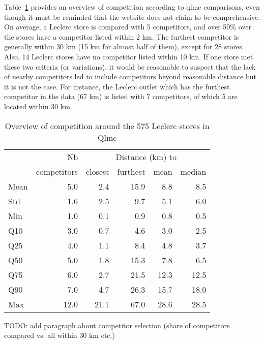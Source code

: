 \documentclass[english]{article}
\begin{document}
Table~\ref{tab:qlmc_comp} provides an overview of competition according to qlmc comparisons, even though it must be reminded that the website does not claim to be comprehensive. On average, a Leclerc store is compared with 5 competitors, and over 50\% over the stores have a competitor listed within 2 km. The furthest competitor is generally within 30 km (15 km for almost half of them), except for 28 stores. Also, 14 Leclerc stores have no competitor listed within 10 km. If one store met these two criteria (or variations), it would be reasonable to suspect that the lack of nearby competitors led to include competitors beyond reasonable distance but it is not the case. For instance, the Leclerc outlet which has the furthest competitor in the data (67 km) is listed with 7 competitors, of which 5 are located within 30 km.

\begin{table}[H]
\renewcommand{\arraystretch}{0.7}%
\caption{Overview of competition around the 575 Leclerc stores in Qlmc}\label{tab:qlmc_comp}
\small
\begin{tabular}{lr|rrrr}
\toprule
\toprule
{}         & Nb          &    \multicolumn{4}{c}{Distance (km) to} \\
{}         & competitors &    closest & furthest & mean & median \\
\midrule
Mean  &   5.0 &   2.4 &  15.9 &   8.8 &     8.5 \\
Std   &   1.6 &   2.5 &   9.7 &   5.1 &     6.0 \\
Min   &   1.0 &   0.1 &   0.9 &   0.8 &     0.5 \\
Q10   &   3.0 &   0.7 &   4.6 &   3.0 &     2.5 \\
Q25   &   4.0 &   1.1 &   8.4 &   4.8 &     3.7 \\
Q50   &   5.0 &   1.8 &  15.3 &   7.8 &     6.5 \\
Q75   &   6.0 &   2.7 &  21.5 &  12.3 &    12.5 \\
Q90   &   7.0 &   4.7 &  26.3 &  15.7 &    18.0 \\
Max   &  12.0 &  21.1 &  67.0 &  28.6 &    28.5 \\
\bottomrule
\bottomrule
\end{tabular}
\end{table}

TODO: add paragraph about competitor selection (share of competitors compared vs. all within 30 km etc.)
\end{document}
